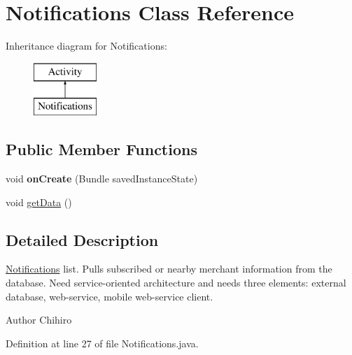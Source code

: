 \hypertarget{classapp_1_1localization_1_1_notifications}{\section{Notifications Class Reference}
\label{classapp_1_1localization_1_1_notifications}
}
Inheritance diagram for Notifications\-:\begin{figure}[H]
\begin{center}
\leavevmode
\includegraphics[height=2.000000cm]{classapp_1_1localization_1_1_notifications}
\end{center}
\end{figure}
\subsection*{Public Member Functions}
\begin{DoxyCompactItemize}
\item 
\hypertarget{classapp_1_1localization_1_1_notifications_a85e87cb5ced88dff7c8173ecc4f636d1}{void {\bfseries on\-Create} (Bundle saved\-Instance\-State)}\label{classapp_1_1localization_1_1_notifications_a85e87cb5ced88dff7c8173ecc4f636d1}

\item 
void \hyperlink{classapp_1_1localization_1_1_notifications_a63e4aea9eb9a73812933b509b20b82e5}{get\-Data} ()
\end{DoxyCompactItemize}


\subsection{Detailed Description}
\hyperlink{classapp_1_1localization_1_1_notifications}{Notifications} list. Pulls subscribed or nearby merchant information from the database. Need service-\/oriented architecture and needs three elements\-: external database, web-\/service, mobile web-\/service client. \begin{DoxyAuthor}{Author}
Chihiro 
\end{DoxyAuthor}


Definition at line 27 of file Notifications.\-java.



